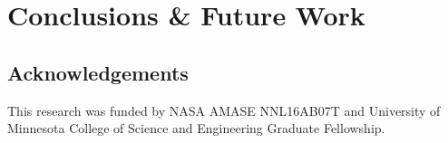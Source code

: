 \section{Conclusions \& Future Work}


\subsection*{Acknowledgements} This research was funded by NASA AMASE NNL16AB07T and University of Minnesota College of Science and Engineering Graduate Fellowship.


